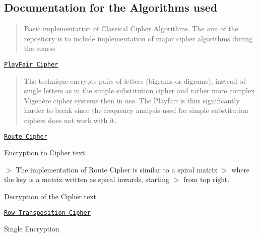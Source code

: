 \subsection*{Documentation for the Algorithms used }

\begin{quote}
Basic implementation of Classical Cipher Algorithms. The aim of the repository is to include implementation of major cipher algorithms during the course \end{quote}



\begin{DoxyEnumerate}
\item \href{https://en.wikipedia.org/wiki/Playfair_cipher}{\tt Play\+Fair Cipher} \begin{quote}
The technique encrypts pairs of letters (bigrams or digrams), instead of single letters as in the simple substitution cipher and rather more complex Vigenère cipher systems then in use. The Playfair is thus significantly harder to break since the frequency analysis used for simple substitution ciphers does not work with it. \end{quote}

\item \href{https://en.wikipedia.org/wiki/Transposition_cipher#Route_cipher}{\tt Route Cipher}
\begin{DoxyItemize}
\item Encryption to Cipher text

$>$ The implementation of Route Cipher is similar to a spiral matrix $>$ where the key is a matrix written as spiral inwards, starting $>$ from top right.
\item Decryption of the Cipher text
\end{DoxyItemize}
\item \href{https://en.wikipedia.org/wiki/Transposition_cipher#Columnar_transposition}{\tt Row Transposition Cipher} \begin{quote}
\end{quote}

\end{DoxyEnumerate}
\begin{DoxyItemize}
\item Single Encryption
\end{DoxyItemize}